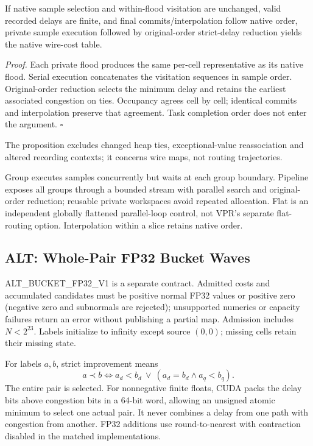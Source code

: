 \begin{proposition}
If native sample selection and within-flood visitation are unchanged, valid recorded delays are finite, and final commits/interpolation follow native order, private sample execution followed by original-order strict-delay reduction yields the native wire-cost table.
\end{proposition}
\noindent\emph{Proof.} Each private flood produces the same per-cell representative as its native flood. Serial execution concatenates the visitation sequences in sample order. Original-order reduction selects the minimum delay and retains the earliest associated congestion on ties. Occupancy agrees cell by cell; identical commits and interpolation preserve that agreement. Task completion order does not enter the argument. $\square$

The proposition excludes changed heap ties, exceptional-value reassociation and altered recording contexts; it concerns wire maps, not routing trajectories.

Group executes samples concurrently but waits at each group boundary. Pipeline exposes all groups through a bounded stream with parallel search and original-order reduction; reusable private workspaces avoid repeated allocation. Flat is an independent globally flattened parallel-loop control, not VPR's separate flat-routing option. Interpolation within a slice retains native order.

\subsection{ALT: Whole-Pair FP32 Bucket Waves}
ALT\_BUCKET\_FP32\_V1 is a separate contract. Admitted costs and accumulated candidates must be positive normal FP32 values or positive zero (negative zero and subnormals are rejected); unsupported numerics or capacity failures return an error without publishing a partial map. Admission includes $N<2^{23}$. Labels initialize to infinity except source $(0,0)$; missing cells retain their missing state.

For labels $a,b$, strict improvement means
\begin{equation}
a\prec b\iff a_d<b_d\ \lor\ (a_d=b_d\land a_q<b_q).
\end{equation}
The entire pair is selected. For nonnegative finite floats, CUDA packs the delay bits above congestion bits in a 64-bit word, allowing an unsigned atomic minimum to select one actual pair. It never combines a delay from one path with congestion from another. FP32 additions use round-to-nearest with contraction disabled in the matched implementations.

